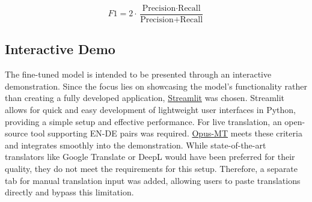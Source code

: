 \[
F1 = 2 \cdot \frac{\text{Precision} \cdot \text{Recall}}{\text{Precision} + \text{Recall}}
\]
\vspace{0.5em}

\subsection{Interactive Demo}
    The fine-tuned model is intended to be presented through an interactive demonstration. Since the focus lies on showcasing the model’s functionality rather than creating a fully developed application, \href{https://streamlit.io/}{Streamlit} was chosen. Streamlit allows for quick and easy development of lightweight user interfaces in Python, providing a simple setup and effective performance. For live translation, an open-source tool supporting EN-DE pairs was required. \href{https://github.com/Helsinki-NLP/Opus-MT}{Opus-MT} \parencite{tiedemannOPUSMTBuildingOpen2020} meets these criteria and integrates smoothly into the demonstration. While state-of-the-art translators like Google Translate or DeepL would have been preferred for their quality, they do not meet the requirements for this setup. Therefore, a separate tab for manual translation input was added, allowing users to paste translations directly and bypass this limitation.